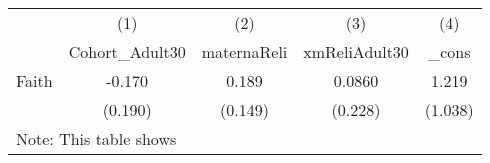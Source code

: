 {
\def\sym#1{\ifmmode^{#1}\else\(^{#1}\)\fi}
\begin{tabular}{l*{4}{c}}
\hline\hline
            &\multicolumn{1}{c}{(1)}&\multicolumn{1}{c}{(2)}&\multicolumn{1}{c}{(3)}&\multicolumn{1}{c}{(4)}\\
            &\multicolumn{1}{c}{Cohort\_Adult30}&\multicolumn{1}{c}{maternaReli}&\multicolumn{1}{c}{xmReliAdult30}&\multicolumn{1}{c}{\_cons}\\
\hline
Faith       &      -0.170         &       0.189         &      0.0860         &       1.219         \\
            &     (0.190)         &     (0.149)         &     (0.228)         &     (1.038)         \\
\hline\hline
\multicolumn{5}{l}{\footnotesize Note: This table shows}\\
\end{tabular}
}
